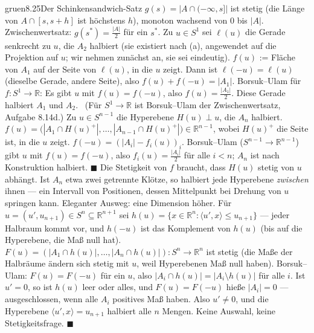 \begin{loesungkarte}{gruen}{8.25}{Der Schinkensandwich-Satz}
$g(s) = |A\cap(-\infty, s]|$ ist stetig (die Länge von $A\cap[s, s + h]$ ist höchstens $h$), monoton wachsend von $0$ bis $|A|$. Zwischenwertsatz: $g(s^{*}) = \frac{|A|}2$ für ein $s^{*}$. \checkmark
{}
Zu $u\in S^{1}$ sei $\ell(u)$ die Gerade senkrecht zu $u$, die $A_2$ halbiert (sie existiert nach (a), angewendet auf die Projektion auf $u$; wir nehmen zunächst an, sie sei eindeutig). $f(u)$ := Fläche von $A_1$ auf der Seite von $\ell(u)$, in die $u$ zeigt. Dann ist $\ell(-u) = \ell(u)$ (dieselbe Gerade, andere Seite), also $f(u) + f(-u) = |A_1|$. Borsuk--Ulam für $f\colon S^{1}\to\mathbb R$: Es gibt $u$ mit $f(u) = f(-u)$, also $f(u) = \frac{|A_1|}2$. Diese Gerade halbiert $A_1$ und $A_2$. \checkmark\ (Für $S^{1}\to\mathbb R$ ist Borsuk--Ulam der Zwischenwertsatz, Aufgabe 8.14d.)
Zu $u\in S^{n-1}$ die Hyperebene $H(u)\perp u$, die $A_n$ halbiert. $f(u) = \bigl(|A_1\cap H(u)^{+}|, \dots, |A_{n-1}\cap H(u)^{+}|\bigr)\in\mathbb R^{n-1}$, wobei $H(u)^{+}$ die Seite ist, in die $u$ zeigt. $f(-u) = (|A_i| - f_i(u))_i$. Borsuk--Ulam ($S^{n-1}\to\mathbb R^{n-1}$) gibt $u$ mit $f(u) = f(-u)$, also $f_i(u) = \frac{|A_i|}2$ für alle $i < n$; $A_n$ ist nach Konstruktion halbiert. $\blacksquare$
Die Stetigkeit von $f$ braucht, dass $H(u)$ stetig von $u$ abhängt. Ist $A_n$ etwa zwei getrennte Klötze, so halbiert jede Hyperebene \emph{zwischen} ihnen --- ein Intervall von Positionen, dessen Mittelpunkt bei Drehung von $u$ springen kann. Eleganter Ausweg: eine Dimension höher. Für $u = (u', u_{n+1})\in S^{n}\subseteq\mathbb R^{n+1}$ sei $h(u) = \{x\in\mathbb R^{n}\colon\langle u', x\rangle\le u_{n+1}\}$ --- jeder Halbraum kommt vor, und $h(-u)$ ist das Komplement von $h(u)$ (bis auf die Hyperebene, die Maß null hat). $F(u) = (|A_1\cap h(u)|, \dots, |A_n\cap h(u)|)\colon S^{n}\to\mathbb R^{n}$ ist stetig (die Maße der Halbräume ändern sich stetig mit $u$, weil Hyperebenen Maß null haben). Borsuk--Ulam: $F(u) = F(-u)$ für ein $u$, also $|A_i\cap h(u)| = |A_i\setminus h(u)|$ für alle $i$. Ist $u' = 0$, so ist $h(u)$ leer oder alles, und $F(u) = F(-u)$ hieße $|A_i| = 0$ --- ausgeschlossen, wenn alle $A_i$ positives Maß haben. Also $u'\neq0$, und die Hyperebene $\langle u', x\rangle = u_{n+1}$ halbiert alle $n$ Mengen. Keine Auswahl, keine Stetigkeitsfrage. $\blacksquare$

\end{loesungkarte}
